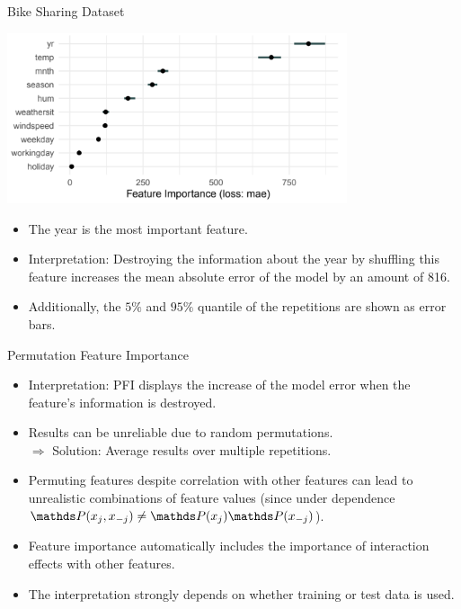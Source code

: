 \documentclass[11pt,compress,t,notes=noshow, xcolor=table]{beamer}
\begin{document}
\begin{vbframe}{Bike Sharing Dataset}

\begin{center}
\includegraphics[width=0.75\textwidth]{figure_man/bike-sharing02.png}
\end{center}

\begin{itemize}
 \item The year is the most important feature.
 \item Interpretation: Destroying the information about the year by shuffling this feature increases the mean absolute error of the model by an amount of 816.
 \item Additionally, the $5 \%$ and $95 \%$ quantile of the repetitions are shown as error bars.
\end{itemize}
\end{vbframe}

\begin{vbframe}{Permutation Feature Importance}
 \begin{itemize}
 \itemsep1em
  \item Interpretation: PFI displays the increase of the model error when the feature's information is destroyed.
  \item Results can be unreliable due to random permutations. \\
  $\Rightarrow$ Solution: Average results over multiple repetitions.
  \item Permuting features despite correlation with other features can lead to unrealistic combinations of feature values (since under dependence $\P(x_j,x_{-j}) \neq \P(x_j) \P(x_{-j})$).
  \item Feature importance automatically includes the importance of interaction effects with other features.
  \item The interpretation strongly depends on whether training or test data is used.\\
 \end{itemize}
\end{vbframe}
\end{document}
